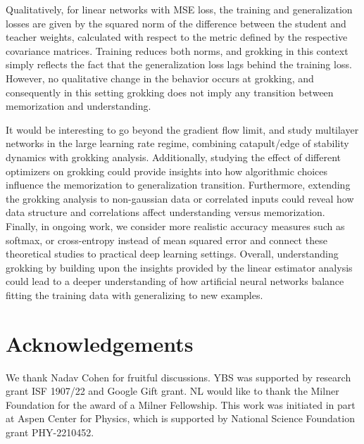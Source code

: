 \documentclass[a4paper,11pt]{article}
\begin{document}
Qualitatively, for linear networks with MSE loss, the training and generalization losses are given by the squared norm of the difference between the student and teacher weights, calculated with respect to the metric defined by the respective covariance matrices. Training reduces both norms, and grokking in this context simply reflects the fact that the generalization loss lags behind the training loss. However, no qualitative change in the behavior occurs at grokking, and consequently in this setting grokking does not imply any transition between memorization and understanding.

It would be interesting to go beyond the gradient flow limit, and study multilayer networks in the large learning rate regime, combining catapult/edge of stability dynamics with grokking analysis. 
Additionally, studying the effect of different optimizers on grokking could provide insights into how algorithmic choices influence the memorization to generalization transition. Furthermore, extending the grokking analysis to non-gaussian data or correlated inputs could reveal how data structure and correlations affect understanding versus memorization. Finally, in ongoing work, we consider more realistic accuracy measures such as softmax, or cross-entropy instead of mean squared error and connect these theoretical studies to practical deep learning settings. Overall, understanding grokking by building upon the insights provided by the linear estimator analysis could lead to a deeper understanding of how artificial neural networks balance fitting the training data with generalizing to new examples.

\section{Acknowledgements}
\label{sec:ack}
We thank Nadav Cohen for fruitful discussions. YBS was supported by research grant ISF 1907/22 and Google Gift grant. NL would like to thank the Milner Foundation for the award of a Milner Fellowship. This work was initiated in part at Aspen Center for Physics, which is supported by National Science Foundation grant PHY-2210452.

% 




\newpage

\appendix

\end{document}
